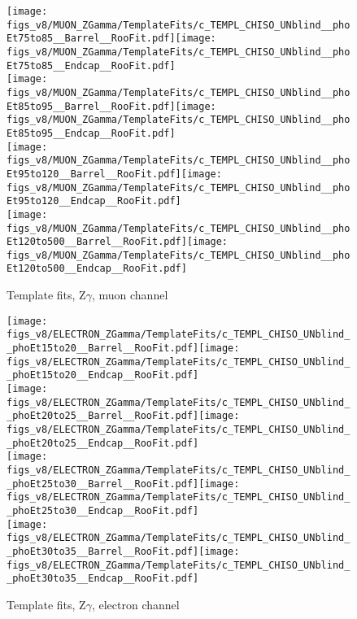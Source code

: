 \begin{figure}[htb]
  \begin{center}
   \texttt{[image: figs\_v8/MUON\_ZGamma/TemplateFits/c\_TEMPL\_CHISO\_UNblind\_\_phoEt75to85\_\_Barrel\_\_RooFit.pdf]}\texttt{[image: figs\_v8/MUON\_ZGamma/TemplateFits/c\_TEMPL\_CHISO\_UNblind\_\_phoEt75to85\_\_Endcap\_\_RooFit.pdf]}\\
   \texttt{[image: figs\_v8/MUON\_ZGamma/TemplateFits/c\_TEMPL\_CHISO\_UNblind\_\_phoEt85to95\_\_Barrel\_\_RooFit.pdf]}\texttt{[image: figs\_v8/MUON\_ZGamma/TemplateFits/c\_TEMPL\_CHISO\_UNblind\_\_phoEt85to95\_\_Endcap\_\_RooFit.pdf]}\\
   \texttt{[image: figs\_v8/MUON\_ZGamma/TemplateFits/c\_TEMPL\_CHISO\_UNblind\_\_phoEt95to120\_\_Barrel\_\_RooFit.pdf]}\texttt{[image: figs\_v8/MUON\_ZGamma/TemplateFits/c\_TEMPL\_CHISO\_UNblind\_\_phoEt95to120\_\_Endcap\_\_RooFit.pdf]}\\
   \texttt{[image: figs\_v8/MUON\_ZGamma/TemplateFits/c\_TEMPL\_CHISO\_UNblind\_\_phoEt120to500\_\_Barrel\_\_RooFit.pdf]}\texttt{[image: figs\_v8/MUON\_ZGamma/TemplateFits/c\_TEMPL\_CHISO\_UNblind\_\_phoEt120to500\_\_Endcap\_\_RooFit.pdf]}\\
  \label{fig:templateFits_CHISO_MUON_ZGamma_3}
  \caption{Template fits, Z$\gamma$, muon channel}
  \end{center}
\end{figure}

\begin{figure}[htb]
  \begin{center}
   \texttt{[image: figs\_v8/ELECTRON\_ZGamma/TemplateFits/c\_TEMPL\_CHISO\_UNblind\_\_phoEt15to20\_\_Barrel\_\_RooFit.pdf]}\texttt{[image: figs\_v8/ELECTRON\_ZGamma/TemplateFits/c\_TEMPL\_CHISO\_UNblind\_\_phoEt15to20\_\_Endcap\_\_RooFit.pdf]}\\
   \texttt{[image: figs\_v8/ELECTRON\_ZGamma/TemplateFits/c\_TEMPL\_CHISO\_UNblind\_\_phoEt20to25\_\_Barrel\_\_RooFit.pdf]}\texttt{[image: figs\_v8/ELECTRON\_ZGamma/TemplateFits/c\_TEMPL\_CHISO\_UNblind\_\_phoEt20to25\_\_Endcap\_\_RooFit.pdf]}\\
   \texttt{[image: figs\_v8/ELECTRON\_ZGamma/TemplateFits/c\_TEMPL\_CHISO\_UNblind\_\_phoEt25to30\_\_Barrel\_\_RooFit.pdf]}\texttt{[image: figs\_v8/ELECTRON\_ZGamma/TemplateFits/c\_TEMPL\_CHISO\_UNblind\_\_phoEt25to30\_\_Endcap\_\_RooFit.pdf]}\\
   \texttt{[image: figs\_v8/ELECTRON\_ZGamma/TemplateFits/c\_TEMPL\_CHISO\_UNblind\_\_phoEt30to35\_\_Barrel\_\_RooFit.pdf]}\texttt{[image: figs\_v8/ELECTRON\_ZGamma/TemplateFits/c\_TEMPL\_CHISO\_UNblind\_\_phoEt30to35\_\_Endcap\_\_RooFit.pdf]}\\
  \label{fig:templateFits_CHISO_ELECTRON_ZGamma_1}
  \caption{Template fits, Z$\gamma$, electron channel}
  \end{center}
\end{figure}

